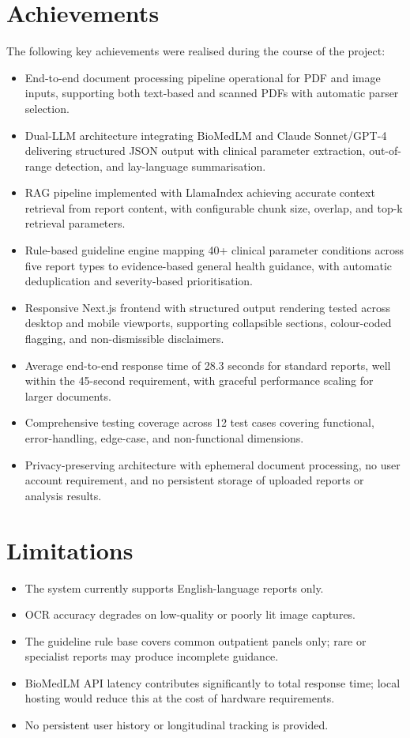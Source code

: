 \documentclass[12pt,a4paper]{report}
\begin{document}
\section{Achievements}
The following key achievements were realised during the course of the project:

\begin{itemize}
    \item End-to-end document processing pipeline operational for PDF and image inputs, supporting both text-based and scanned PDFs with automatic parser selection.
    \item Dual-LLM architecture integrating BioMedLM and Claude Sonnet/GPT-4 delivering structured JSON output with clinical parameter extraction, out-of-range detection, and lay-language summarisation.
    \item RAG pipeline implemented with LlamaIndex achieving accurate context retrieval from report content, with configurable chunk size, overlap, and top-k retrieval parameters.
    \item Rule-based guideline engine mapping 40+ clinical parameter conditions across five report types to evidence-based general health guidance, with automatic deduplication and severity-based prioritisation.
    \item Responsive Next.js frontend with structured output rendering tested across desktop and mobile viewports, supporting collapsible sections, colour-coded flagging, and non-dismissible disclaimers.
    \item Average end-to-end response time of 28.3 seconds for standard reports, well within the 45-second requirement, with graceful performance scaling for larger documents.
    \item Comprehensive testing coverage across 12 test cases covering functional, error-handling, edge-case, and non-functional dimensions.
    \item Privacy-preserving architecture with ephemeral document processing, no user account requirement, and no persistent storage of uploaded reports or analysis results.
\end{itemize}

\section{Limitations}
\begin{itemize}
    \item The system currently supports English-language reports only.
    \item OCR accuracy degrades on low-quality or poorly lit image captures.
    \item The guideline rule base covers common outpatient panels only; rare or specialist reports may produce incomplete guidance.
    \item BioMedLM API latency contributes significantly to total response time; local hosting would reduce this at the cost of hardware requirements.
    \item No persistent user history or longitudinal tracking is provided.
\end{itemize}
\end{document}
